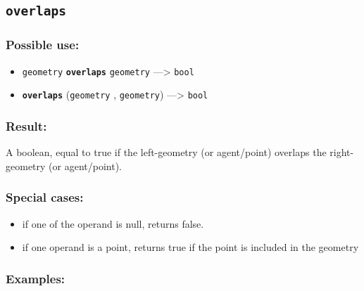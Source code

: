 \documentclass[]{book}
\providecommand{\tightlist}{%
  \setlength{\itemsep}{0pt}\setlength{\parskip}{0pt}}
\theoremstyle{definition}
\theoremstyle{definition}
\theoremstyle{definition}
\theoremstyle{remark}
\begin{document}
\subsection{\texorpdfstring{\texttt{overlaps}}{overlaps}}\label{overlaps}

\subsubsection{Possible use:}\label{possible-use-391}

\begin{itemize}
\tightlist
\item
  \texttt{geometry} \textbf{\texttt{overlaps}} \texttt{geometry}
  ---\textgreater{} \texttt{bool}
\item
  \textbf{\texttt{overlaps}} (\texttt{geometry} , \texttt{geometry})
  ---\textgreater{} \texttt{bool}
\end{itemize}

\subsubsection{Result:}\label{result-377}

A boolean, equal to true if the left-geometry (or agent/point) overlaps
the right-geometry (or agent/point).

\subsubsection{Special cases:}\label{special-cases-108}

\begin{itemize}
\tightlist
\item
  if one of the operand is null, returns false.\\
\item
  if one operand is a point, returns true if the point is included in
  the geometry
\end{itemize}

\subsubsection{Examples:}\label{examples-269}
\end{document}
